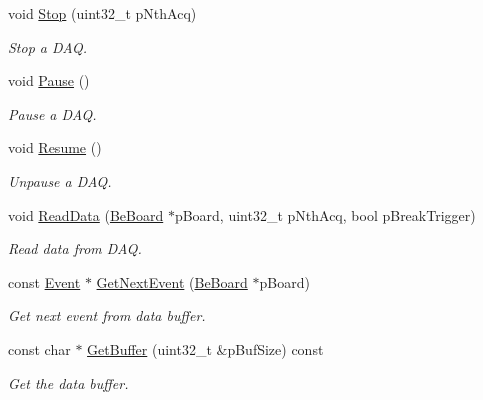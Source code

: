 \begin{CompactItemize}
void \hyperlink{class_ph2___hw_interface_1_1_glib_f_w_interface_d980b1ab04d9f87f1a26978201e42997}{Stop} (uint32\_\-t p\-Nth\-Acq)
\begin{CompactList}\small\item\em Stop a DAQ. \item\end{CompactList}\item 
void \hyperlink{class_ph2___hw_interface_1_1_glib_f_w_interface_05d7f790e0316b51714293e8089086f3}{Pause} ()
\begin{CompactList}\small\item\em Pause a DAQ. \item\end{CompactList}\item 
void \hyperlink{class_ph2___hw_interface_1_1_glib_f_w_interface_edd3abfb576016701da27fabc975ac13}{Resume} ()
\begin{CompactList}\small\item\em Unpause a DAQ. \item\end{CompactList}\item 
void \hyperlink{class_ph2___hw_interface_1_1_glib_f_w_interface_26c35fec3518f40d09ebc7f0114be19b}{Read\-Data} (\hyperlink{class_ph2___hw_description_1_1_be_board}{Be\-Board} $\ast$p\-Board, uint32\_\-t p\-Nth\-Acq, bool p\-Break\-Trigger)
\begin{CompactList}\small\item\em Read data from DAQ. \item\end{CompactList}\item 
const \hyperlink{class_ph2___hw_interface_1_1_event}{Event} $\ast$ \hyperlink{class_ph2___hw_interface_1_1_glib_f_w_interface_091f683a54134b92837344da3b3e6eae}{Get\-Next\-Event} (\hyperlink{class_ph2___hw_description_1_1_be_board}{Be\-Board} $\ast$p\-Board)
\begin{CompactList}\small\item\em Get next event from data buffer. \item\end{CompactList}\item 
const char $\ast$ \hyperlink{class_ph2___hw_interface_1_1_glib_f_w_interface_fecc24a91ec1551bca53589994dd62d2}{Get\-Buffer} (uint32\_\-t \&p\-Buf\-Size) const 
\begin{CompactList}\small\item\em Get the data buffer. \item\end{CompactList}\item 

\end{CompactItemize}
